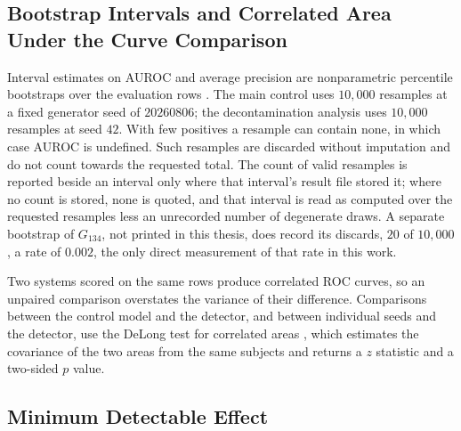 \subsection{Bootstrap Intervals and Correlated Area Under the Curve Comparison}

Interval estimates on AUROC and average precision are nonparametric percentile bootstraps over the
evaluation rows \citep{efron1994bootstrap}. The main control uses $10{,}000$ resamples at a fixed
generator seed of $20260806$; the decontamination analysis uses $10{,}000$ resamples at seed $42$.
With few positives a resample can contain none, in which case AUROC is undefined. Such resamples are discarded without imputation and do not count towards the requested total. The count of valid
resamples is reported beside an interval only where that interval's result file stored it; where no
count is stored, none is quoted, and that interval is read as computed over the requested resamples
less an unrecorded number of degenerate draws. A separate bootstrap of $G_{134}$, not printed in this
thesis, does record its discards, $20$ of $10{,}000$, a rate of $0.002$, the only direct measurement
of that rate in this work.

Two systems scored on the same rows produce correlated ROC curves, so an unpaired comparison
overstates the variance of their difference. Comparisons between the control model and the
detector, and between individual seeds and the detector, use the DeLong test for correlated areas
\citep{delong1988comparing}, which estimates the covariance of the two areas from the same subjects
and returns a $z$ statistic and a two-sided $p$ value.

\subsection{Minimum Detectable Effect}
\label{sec:m-mde}

